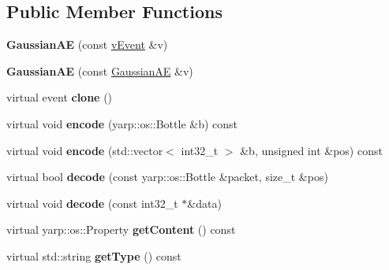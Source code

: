 \subsection*{Public Member Functions}
\begin{DoxyCompactItemize}
\item 
\mbox{\label{classev_1_1GaussianAE_abc9c34d68ad44ea743b565a6206e591f}} 
{\bfseries Gaussian\+AE} (const \hyperlink{classev_1_1vEvent}{v\+Event} \&v)
\item 
\mbox{\label{classev_1_1GaussianAE_ac5934905f00cc08eb9c444f67e0ec6a2}} 
{\bfseries Gaussian\+AE} (const \hyperlink{classev_1_1GaussianAE}{Gaussian\+AE} \&v)
\item 
\mbox{\label{classev_1_1GaussianAE_aa9e649d9039d3e9348cea99352df77c5}} 
virtual event {\bfseries clone} ()
\item 
\mbox{\label{classev_1_1GaussianAE_a8ac9f9d68e23134e64ab37215c4feadd}} 
virtual void {\bfseries encode} (yarp\+::os\+::\+Bottle \&b) const
\item 
\mbox{\label{classev_1_1GaussianAE_a4f337114d2e9d3d142953525a6eb7418}} 
virtual void {\bfseries encode} (std\+::vector$<$ int32\+\_\+t $>$ \&b, unsigned int \&pos) const
\item 
\mbox{\label{classev_1_1GaussianAE_a508515e443b7c3c5ffd1f3fd02ced00a}} 
virtual bool {\bfseries decode} (const yarp\+::os\+::\+Bottle \&packet, size\+\_\+t \&pos)
\item 
\mbox{\label{classev_1_1GaussianAE_aa24997795ded9df87a8013ca45bb4d20}} 
virtual void {\bfseries decode} (const int32\+\_\+t $\ast$\&data)
\item 
\mbox{\label{classev_1_1GaussianAE_ad0738c9667722bbd4cc5cb786028dca6}} 
virtual yarp\+::os\+::\+Property {\bfseries get\+Content} () const
\item 
\mbox{\label{classev_1_1GaussianAE_acc5728386bc75bead01615c96ae4dab1}} 
virtual std\+::string {\bfseries get\+Type} () const
\end{DoxyCompactItemize}
